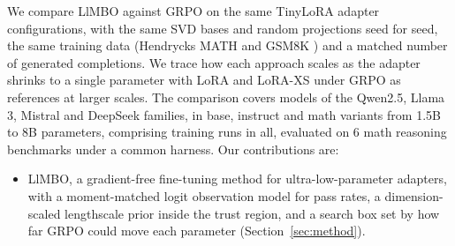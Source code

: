 \documentclass[twoside]{article}
\newcommand{\llmbo}{LlMBO}
\begin{document}
We compare \llmbo{} against GRPO on the same TinyLoRA adapter configurations, with the same SVD bases and random projections seed for seed, the same training data (Hendrycks MATH \citep{hendrycks2021math} and GSM8K \citep{cobbe2021gsm8k}) and a matched number of generated completions. We trace how each approach scales as the adapter shrinks to a single parameter with LoRA and LoRA-XS under GRPO as references at larger scales. The comparison covers \nModels{} models of the Qwen2.5, Llama 3, Mistral and DeepSeek families, in base, instruct and math variants from 1.5B to 8B parameters, comprising \nRuns{} training runs in all, evaluated on 6 math reasoning benchmarks under a common harness.
Our contributions are:
\begin{itemize}
    \item \llmbo{}, a gradient-free fine-tuning method for ultra-low-parameter adapters, with a moment-matched logit observation model for pass rates, a dimension-scaled lengthscale prior inside the trust region, and a search box set by how far GRPO could move each parameter (Section~\ref{sec:method}).

\end{itemize}
\end{document}
